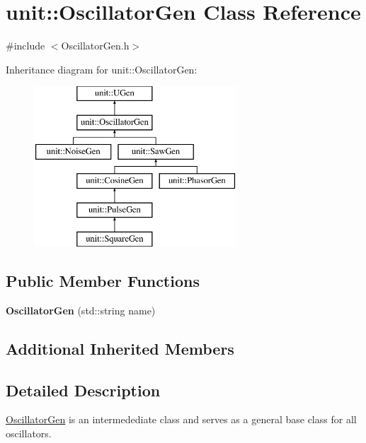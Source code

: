 \hypertarget{classunit_1_1OscillatorGen}{}\section{unit\+:\+:Oscillator\+Gen Class Reference}
\label{classunit_1_1OscillatorGen}


{\ttfamily \#include $<$Oscillator\+Gen.\+h$>$}

Inheritance diagram for unit\+:\+:Oscillator\+Gen\+:\begin{figure}[H]
\begin{center}
\leavevmode
\includegraphics[height=6.000000cm]{classunit_1_1OscillatorGen}
\end{center}
\end{figure}
\subsection*{Public Member Functions}
\begin{DoxyCompactItemize}
\item 
{\bfseries Oscillator\+Gen} (std\+::string name)\hypertarget{classunit_1_1OscillatorGen_ab84067cdd1c0a20d238ddcaaadda12da}{}\label{classunit_1_1OscillatorGen_ab84067cdd1c0a20d238ddcaaadda12da}

\end{DoxyCompactItemize}
\subsection*{Additional Inherited Members}


\subsection{Detailed Description}
\hyperlink{classunit_1_1OscillatorGen}{Oscillator\+Gen} is an intermedediate class and serves as a general base class for all oscillators.


